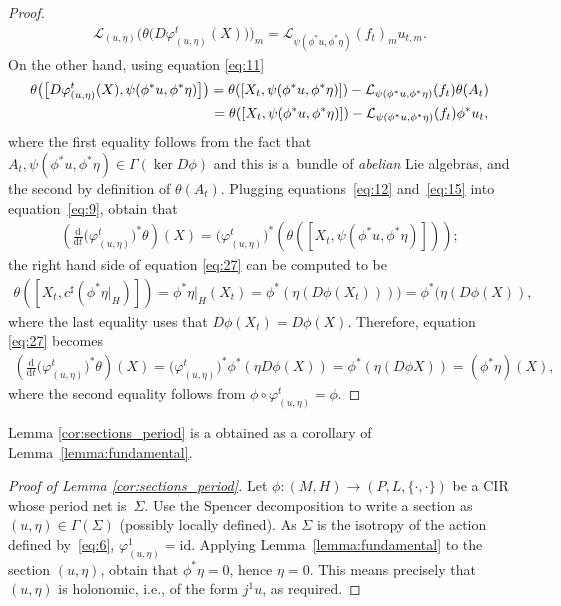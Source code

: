 \documentclass[10pt,a4paper]{amsart}
\numberwithin{equation}{section}
\newcommand{\de}{\mathrm{d}} %
\newcommand{\CM}{(M,H)} %
\begin{document}
\begin{proof}
 \begin{gather} \label{eq:12}
 \mathcal{L}_{(u,\eta)}\big( \theta\big(D \varphi^t_{(u,\eta)}(X)\big)\big)_m =\mathcal{L}_{\psi(\phi^*u,\phi^*\eta)}(f_t)_mu_{t,m}.
 \end{gather}
On the other hand, using equation \eqref{eq:11}
 \begin{gather}
\theta \big(\big[D\varphi^t_{(u,\eta)}(X), \psi(\phi^*u,\phi^*\eta)\big]\big) = \theta([X_t,\psi(\phi^*u,\phi^*\eta)]) - \mathcal{L}_{\psi(\phi^*u,\phi^*\eta)}(f_{t})\theta(A_{t})\nonumber\\
 \hphantom{\theta \big(\big[D\varphi^t_{(u,\eta)}(X), \psi(\phi^*u,\phi^*\eta)\big]\big)}{}
 = \theta([X_t,\psi(\phi^*u,\phi^*\eta)]) - \mathcal{L}_{\psi(\phi^*u,\phi^*\eta)}(f_{t}) \phi^* u_{t}, \label{eq:15}
\end{gather}
where the f\/irst equality follows from the fact that $A_{t}, \psi(\phi^*u,\phi^*\eta) \in \Gamma(\ker D\phi)$ and this is a~bundle of {\it abelian} Lie algebras, and the second by def\/inition of $\theta(A_{t})$. Plugging equations~\eqref{eq:12} and~\eqref{eq:15} into equation~\eqref{eq:9}, obtain that
 \begin{gather} \label{eq:27}
 \left( \frac{\de}{\de t} \big(\varphi^t_{(u,\eta)}\big)^* \theta\right)(X)
 = \big(\varphi^t_{(u,\eta)}\big)^*(\theta([X_t,\psi(\phi^*u,\phi^*\eta)]));
 \end{gather}
the right hand side of equation \eqref{eq:27} can be computed to be
 \begin{gather*}
 \theta([X_t,c^{\sharp}( \phi^* \eta \rvert_H)]) = \phi^*\eta \rvert_H(X_t) = \phi^*(\eta(D\phi(X_t)))) = \phi^*(\eta(D\phi(X)),
 \end{gather*}
where the last equality uses that $D\phi(X_t) = D\phi(X)$. Therefore, equation \eqref{eq:27} becomes
 \begin{gather*}
 \left( \frac{\de}{\de t} \big(\varphi^t_{(u,\eta)}\big)^* \theta\right)(X) = \big(\varphi^t_{(u,\eta)}\big)^* \phi^*(\eta
 D\phi(X)) = \phi^*(\eta (D\phi X)) = (\phi^*\eta)(X), \end{gather*}
where the second equality follows from $\phi \circ \varphi^t_{(u,\eta)} = \phi$.
\end{proof}

Lemma \ref{cor:sections_period} is a obtained as a corollary of Lemma~\ref{lemma:fundamental}.

\begin{proof}[Proof of Lemma \ref{cor:sections_period}] Let $\phi\colon \CM\to(P,L,\{\cdot,\cdot\})$ be a CIR whose period net is~$\Sigma$. Use the Spencer decomposition to write a section as $(u,\eta) \in \Gamma(\Sigma)$ (possibly locally def\/ined). As $\Sigma$ is the isotropy of the action def\/ined by~\eqref{eq:6}, $\varphi^1_{(u,\eta)} = \mathrm{id}$. Applying Lemma~\ref{lemma:fundamental} to the section $(u,\eta)$, obtain that $\phi^*\eta= 0$, hence $\eta=0$. This means precisely that $(u,\eta)$ is holonomic, i.e., of the form $j^1 u$, as required.
\end{proof}
\end{document}
